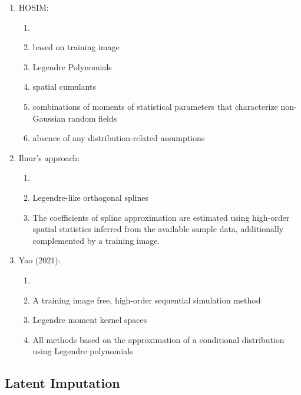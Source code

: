 \begin{enumerate}

    \item HOSIM:
          \begin{enumerate}
              \item \cite{dimitrakopoulos2009highorder,mustapha2010highorder,mustapha2011hosim,tamayomas2016testing}
              \item based on training image
              \item Legendre Polynomials
              \item spatial cumulants
              \item combinations of moments of statistical parameters that characterize non-Gaussian random fields
              \item absence of any distribution-related assumptions
          \end{enumerate}

    \item Ilnur's approach:
          \begin{enumerate}
              \item \cite{minniakhmetov2017joint,minniakhmetov2018highorder, decarvalho2019highorder}
              \item Legendre-like orthogonal splines
              \item The coefficients of spline approximation are estimated using high-order spatial statistics inferred from the available sample data, additionally complemented by a training image.
          \end{enumerate}

    \item Yao (2021):
          \begin{enumerate}
              \item \cite{yao2020highorder,yao2021training,yao2021learning}
              \item A training image free, high-order sequential simulation method
              \item Legendre moment kernel spaces
              \item All methods based on the approximation of a conditional distribution using Legendre polynomials
          \end{enumerate}

\end{enumerate}




\FloatBarrier
\subsection{Latent Imputation}
\label{subsec:01latent}


